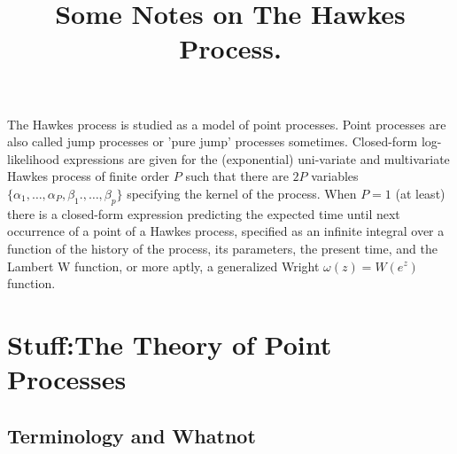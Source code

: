 \documentclass{amsart}
\newcommand{\tmem}[1]{{\em #1\/}}
\begin{document}
{\tmem{}}

\title{Some Notes on The Hawkes Process.}
\author{}
\maketitle

The Hawkes process is studied as a model of point processes. Point processes
are also called jump processes or 'pure jump' processes sometimes. Closed-form
log-likelihood expressions are given for the (exponential) uni-variate and
multivariate Hawkes process of finite order $P$ such that there are $2 P$
variables $\{ \alpha_1, \ldots, \alpha_P, \beta_1 ., \ldots, \beta_p \}$
specifying the kernel of the process. When $P = 1$ (at least) there is a
closed-form expression predicting the expected time until next occurrence of a
point of a Hawkes process, specified as an infinite integral over a function
of the history of the process, its parameters, the present time, and the
Lambert W function, or more aptly, a generalized Wright $\omega ( z) = W (
e^z)$ function.

{\tableofcontents}

\section{Stuff:The Theory of Point Processes}

\subsection{Terminology and Whatnot}
\end{document}
